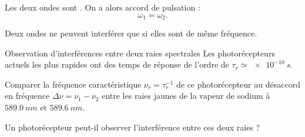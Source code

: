 \documentclass[12pt,fancy]{cours}
\begin{document}
\begin{prop}\label{prop:freq}
Les deux ondes sont . On a alors 
  accord de pulsation :
  $$\omega_1=\omega_2.$$
\end{prop}
Deux ondes ne peuvent interférer que si elles sont de même fréquence.


\begin{exemple}{Observation d'interférences entre deux raies spectrales}
  Les photorécepteurs actuels les plus rapides ont des temps de réponse de l'ordre de $\tau_r \simeq \SI{e-10}{s}$. 
  \begin{quest}
    \item	
    Comparer la fréquence caractéristique $\nu_r = \tau_r^{-1}$ de ce photorécepteur au désaccord en fréquence $\Delta \nu = \nu_1-\nu_2$ entre les raies jaunes de la vapeur de sodium à $\SI{589.0}{nm}$ et $\SI{589.6}{nm}$. 
    \item Un photorécepteur peut-il observer l'interférence entre ces deux raies ?  
  \end{quest}
  \end{exemple}

\end{document}
